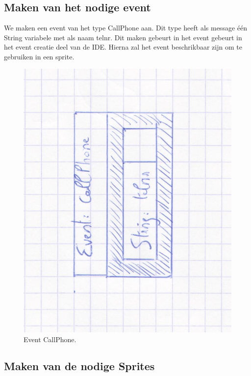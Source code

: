 \documentclass[]{article}
\begin{document}
 \subsection{Maken van het nodige event}
 \label{Maken van het nodige event}
 We maken een event van het type CallPhone aan. Dit type heeft als message \'{e}\'{e}n String variabele met als naam telnr. Dit maken gebeurt in het event gebeurt in het event creatie deel van de IDE. Hierna zal het event beschrikbaar zijn om te gebruiken in een sprite.
 \begin{figure}
  \centering
\includegraphics[scale=0.20]{mockups/callphone.jpg}
  \caption{Event CallPhone.} 
\end{figure} 
\subsection{Maken van de nodige Sprites} 
\end{document}
